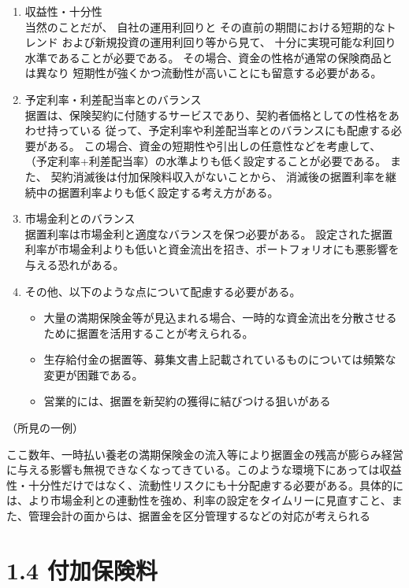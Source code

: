 \documentclass[report,gutter=10mm,fore-edge=10mm,uplatex,dvipdfmx]{jlreq}
\begin{document}
\begin{enumerate}
 \item  収益性・十分性\\
  当然のことだが、
自社の運用利回りと
その直前の期間における短期的なトレンド
および新規投資の運用利回り等から見て、
十分に実現可能な利回り水準であることが必要である。
その場合、資金の性格が通常の保険商品とは異なり
短期性が強くかつ流動性が高いことにも留意する必要がある。
 \item  予定利率・利差配当率とのバランス\\
	据置は、保険契約に付随するサービスであり、契約者価格としての性格をあわせ持っている
	従って、予定利率や利差配当率とのバランスにも配慮する必要がある。
	この場合、資金の短期性や引出しの任意性などを考慮して、
	（予定利率+利差配当率）の水準よりも低く設定することが必要である。
	また、 契約消滅後は付加保険料収入がないことから、
	消滅後の据置利率を継続中の据置利率よりも低く設定する考え方がある。
 \item  市場金利とのバランス\\
   据置利率は市場金利と適度なバランスを保つ必要がある。
   設定された据置利率が市場金利よりも低いと資金流出を招き、ポートフォリオにも悪影響を与える恐れがある。
 \item  その他、以下のような点について配慮する必要がある。
\begin{itemize}
 \item   大量の満期保険金等が見込まれる場合、一時的な資金流出を分散させるために据置を活用することが考えられる。
 \item  生存給付金の据置等、募集文書上記載されているものについては頻繁な変更が困難である。
 \item  営業的には、据置を新契約の獲得に結びつける狙いがある
\end{itemize}
\end{enumerate}

（所見の一例）

ここ数年、一時払い養老の満期保険金の流入等により据置金の残高が膨らみ経営に与える影響も無視できなくなってきている。このような環境下にあっては収益性・十分性だけではなく、流動性リスクにも十分配慮する必要がある。具体的には、より市場金利との連動性を強め、利率の設定をタイムリーに見直すこと、また、管理会計の面からは、据置金を区分管理するなどの対応が考えられる


\section{1.4 付加保険料}
\end{document}
